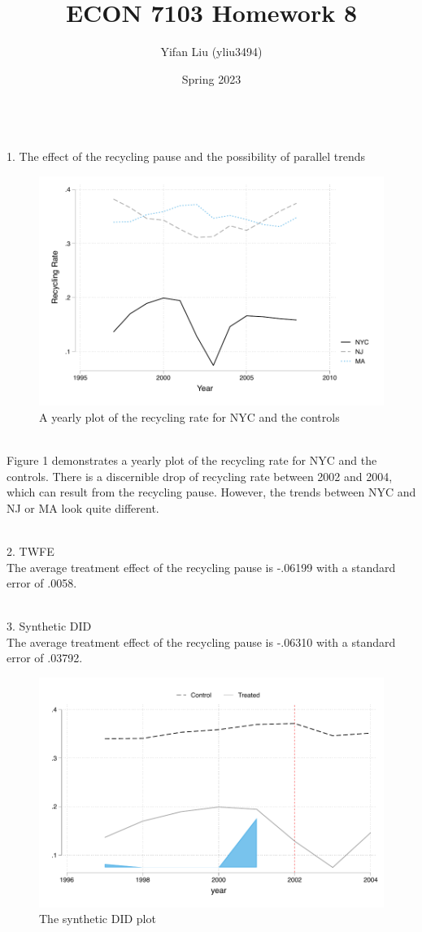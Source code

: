 \documentclass{article}
\title{ECON 7103 Homework 8}
\author{Yifan Liu (yliu3494)}
\date{Spring 2023}
\begin{document}
  
\maketitle


\noindent
\\
1. The effect of the recycling pause and the possibility of parallel trends
\smallskip
\begin{figure}[H]
    \centering
    \includegraphics[scale = 0.7]{Q1.pdf}
    \caption{A yearly plot of the recycling rate for NYC and the controls}
    \label{fig:Q1}
\end{figure}
\noindent
\\ Figure 1 demonstrates a yearly plot of the recycling rate for NYC and the controls. There is a discernible drop of recycling rate between 2002 and 2004, which can result from the recycling pause. However, the trends between NYC and NJ or MA look quite different.
\bigskip

\noindent
\\
2. TWFE
\\ The average treatment effect of the recycling pause is -.06199 with a standard error of .0058.

\noindent
\\
3. Synthetic DID
\\ The average treatment effect of the recycling pause is -.06310 with a standard error of .03792.
\smallskip
\begin{figure}[H]
    \centering
    \includegraphics[scale = 0.7]{Q3.pdf}
    \caption{The synthetic DID plot}
    \label{fig:Q1}
\end{figure}
\end{document}
